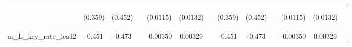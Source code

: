 \documentclass[]{article}
\begin{document}
\begin{center}
\begin{tabular}{lcccccccccccc}
\vspace{4pt} & \begin{footnotesize}(0.359)\end{footnotesize} & \begin{footnotesize}(0.452)\end{footnotesize} & \begin{footnotesize}\end{footnotesize} & \begin{footnotesize}(0.0115)\end{footnotesize} & \begin{footnotesize}(0.0132)\end{footnotesize} & \begin{footnotesize}\end{footnotesize} & \begin{footnotesize}(0.359)\end{footnotesize} & \begin{footnotesize}(0.452)\end{footnotesize} & \begin{footnotesize}\end{footnotesize} & \begin{footnotesize}(0.0115)\end{footnotesize} & \begin{footnotesize}(0.0132)\end{footnotesize} & \begin{footnotesize}\end{footnotesize} \\
m\_L\_key\_rate\_lead2 & -0.451 & -0.473 &  & -0.00350 & 0.00329 &  & -0.451 & -0.473 &  & -0.00350 & 0.00329 &  \\

\end{tabular}
\end{center}
\end{document}
